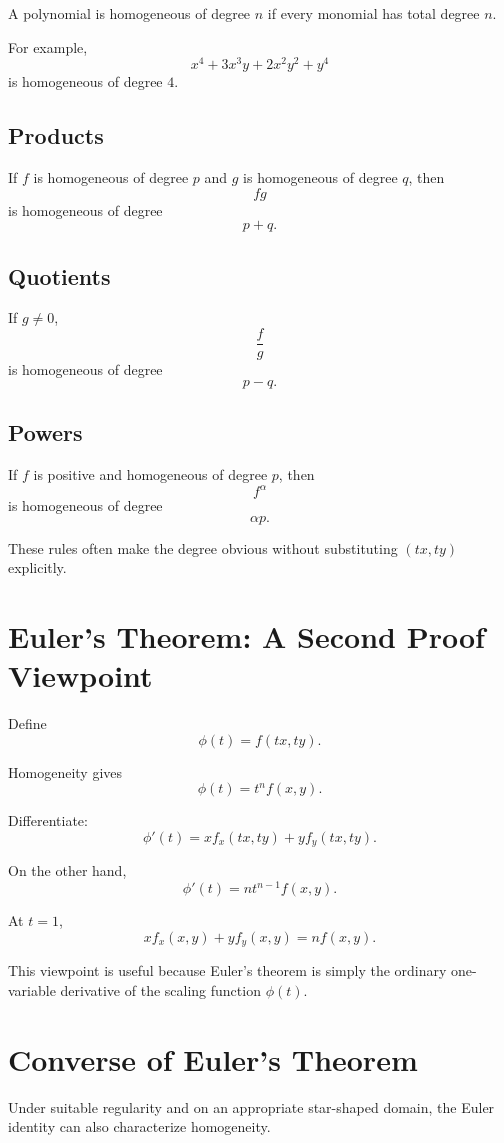 \documentclass[11pt,oneside]{book}
\theoremstyle{studentthm}
\theoremstyle{definition}
\begin{document}
A polynomial is homogeneous of degree \(n\) if every monomial has total
degree \(n\).

For example,
\[
x^4+3x^3y+2x^2y^2+y^4
\]
is homogeneous of degree \(4\).

\subsection*{Products}

If \(f\) is homogeneous of degree \(p\) and \(g\) is homogeneous of
degree \(q\), then
\[
fg
\]
is homogeneous of degree
\[
p+q.
\]

\subsection*{Quotients}

If \(g\ne0\),
\[
\frac{f}{g}
\]
is homogeneous of degree
\[
p-q.
\]

\subsection*{Powers}

If \(f\) is positive and homogeneous of degree \(p\), then
\[
f^\alpha
\]
is homogeneous of degree
\[
\alpha p.
\]

These rules often make the degree obvious without substituting
\((tx,ty)\) explicitly.

\section{Euler's Theorem: A Second Proof Viewpoint}

Define
\[
\phi(t)=f(tx,ty).
\]

Homogeneity gives
\[
\phi(t)=t^nf(x,y).
\]

Differentiate:
\[
\phi'(t)
=
x f_x(tx,ty)
+
y f_y(tx,ty).
\]

On the other hand,
\[
\phi'(t)
=
nt^{n-1}f(x,y).
\]

At \(t=1\),
\[
x f_x(x,y)+y f_y(x,y)=nf(x,y).
\]

This viewpoint is useful because Euler's theorem is simply the ordinary
one-variable derivative of the scaling function \(\phi(t)\).

\section{Converse of Euler's Theorem}

Under suitable regularity and on an appropriate star-shaped domain, the
Euler identity can also characterize homogeneity.
\end{document}
